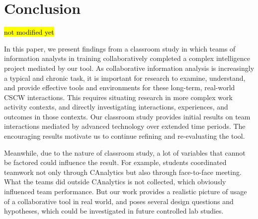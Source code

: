 \section{Conclusion}
\hl{not modified yet}

In this paper, we present findings from a classroom study in which teams of information analysts in training collaboratively completed a complex intelligence project mediated by our tool. As collaborative information analysis is increasingly a typical and chronic task, it is important for research to examine, understand, and provide effective tools and environments for these long-term, real-world CSCW interactions. This requires situating research in more complex work activity contexts, and directly investigating interactions, experiences, and outcomes in those contexts. Our classroom study provides initial results on team interactions mediated by advanced technology over extended time periods. The encouraging results motivate us to continue refining and re-evaluating the tool.

Meanwhile, due to the nature of classroom study, a lot of variables that cannot be factored could influence the result. For example, students coordinated teamwork not only through CAnalytics but also through face-to-face meeting. What the teams did outside CAnalytics is not collected, which obviously influenced team performance. But our work provides a realistic picture of usage of a collaborative tool in real world, and poses several design questions and hypotheses, which could be investigated in future controlled lab studies. 

%
%
%
%
%
